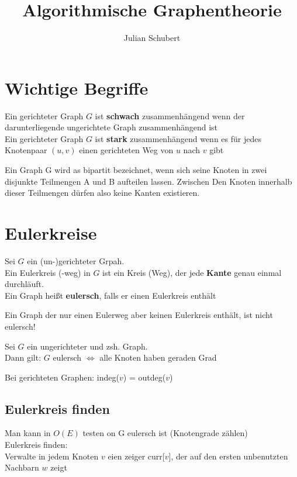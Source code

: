 \documentclass[14pt]{article}
\title{Algorithmische Graphentheorie}
\author{Julian Schubert}
\begin{document}
\maketitle
\tableofcontents

\newpage
\section{Wichtige Begriffe}
\begin{definition}
    Ein gerichteter Graph $G$ ist \textbf{schwach} zusammenhängend
    wenn der darunterliegende ungerichtete Graph zusammenhängend
    ist \\
    Ein gerichteter Graph $G$ ist \textbf{stark} zusammenhängend
    wenn es für jedes Knotenpaar $(u, v)$ einen gerichteten Weg
    von $u$ nach $v$ gibt
\end{definition}
\begin{definition}
    Ein Graph G wird as bipartit bezeichnet, wenn sich seine Knoten
    in zwei disjunkte Teilmengen A und B aufteilen lassen. Zwischen
    Den Knoten innerhalb dieser Teilmengen dürfen also keine Kanten
    existieren.
\end{definition}
\section{Eulerkreise}
\begin{definition}[Eulerkreis]
    Sei $G$ ein (un-)gerichteter Grpah. \\
    Ein Eulerkreis (-weg) in
    $G$ ist ein Kreis (Weg), der jede \textbf{Kante} genau
    einmal durchläuft. \\
    Ein Graph heißt \textbf{eulersch}, falls er einen
    Eulerkreis enthält
\end{definition}
Ein Graph der nur einen Eulerweg aber keinen Eulerkreis
enthält, ist nicht eulersch!
\begin{eigenschaft}
    Sei $G$ ein ungerichteter und zsh. Graph.  \\
    Dann gilt:
    $G$ eulersch $\Leftrightarrow$ alle Knoten haben geraden Grad
\end{eigenschaft}
Bei gerichteten Graphen: indeg($v$) = outdeg($v$)
\subsection{Eulerkreis finden}
Man kann in $O(E)$ testen on G eulersch ist (Knotengrade zählen) \\
Eulerkreis finden: \\
Verwalte in jedem Knoten $v$ eien zeiger curr[$v$], der auf
den ersten unbenutzten Nachbarn $w$ zeigt
\end{document}
